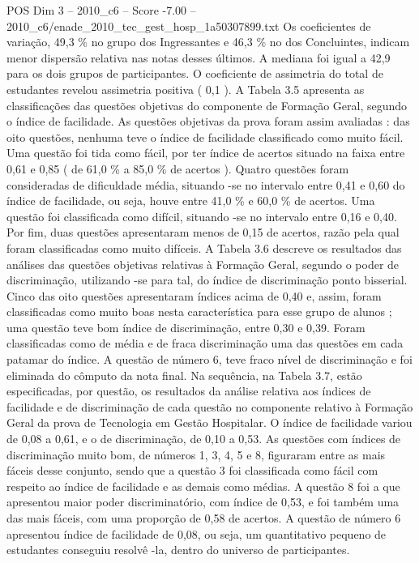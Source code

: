 \begin{textsample}{POS Dim 3 – 2010\_c6 – Score -7.00 – 2010\_c6/enade\_2010\_tec\_gest\_hosp\_1a50307899.txt}
Os coeficientes de variação, 49,3 \% no grupo dos Ingressantes e 46,3 \% no dos Concluintes, indicam menor dispersão relativa nas notas desses últimos.
A mediana foi igual a 42,9 para os dois grupos de participantes.
O coeficiente de assimetria do total de estudantes revelou assimetria positiva ( 0,1 ).
A Tabela 3.5 apresenta as classificações das questões objetivas do componente de Formação Geral, segundo o índice de facilidade.
As questões objetivas da prova foram assim avaliadas : das oito questões, nenhuma teve o índice de facilidade classificado como muito fácil.
Uma questão foi tida como fácil, por ter índice de acertos situado na faixa entre 0,61 e 0,85 ( de 61,0 \% a 85,0 \% de acertos ).
Quatro questões foram consideradas de dificuldade média, situando -se no intervalo entre 0,41 e 0,60 do índice de facilidade, ou seja, houve entre 41,0 \% e 60,0 \% de acertos.
Uma questão foi classificada como difícil, situando -se no intervalo entre 0,16 e 0,40.
Por fim, duas questões apresentaram menos de 0,15 de acertos, razão pela qual foram classificadas como muito difíceis.
A Tabela 3.6 descreve os resultados das análises das questões objetivas relativas à Formação Geral, segundo o poder de discriminação, utilizando -se para tal, do índice de discriminação ponto bisserial.
Cinco das oito questões apresentaram índices acima de 0,40 e, assim, foram classificadas como muito boas nesta característica para esse grupo de alunos ; uma questão teve bom índice de discriminação, entre 0,30 e 0,39.
Foram classificadas como de média e de fraca discriminação uma das questões em cada patamar do índice.
A questão de número 6, teve fraco nível de discriminação e foi eliminada do cômputo da nota final.
Na sequência, na Tabela 3.7, estão especificadas, por questão, os resultados da análise relativa aos índices de facilidade e de discriminação de cada questão no componente relativo à Formação Geral da prova de Tecnologia em Gestão Hospitalar.
O índice de facilidade variou de 0,08 a 0,61, e o de discriminação, de 0,10 a 0,53.
As questões com índices de discriminação muito bom, de números 1, 3, 4, 5 e 8, figuraram entre as mais fáceis desse conjunto, sendo que a questão 3 foi classificada como fácil com respeito ao índice de facilidade e as demais como médias.
A questão 8 foi a que apresentou maior poder discriminatório, com índice de 0,53, e foi também uma das mais fáceis, com uma proporção de 0,58 de acertos.
A questão de número 6 apresentou índice de facilidade de 0,08, ou seja, um quantitativo pequeno de estudantes conseguiu resolvê -la, dentro do universo de participantes.

\end{textsample}
